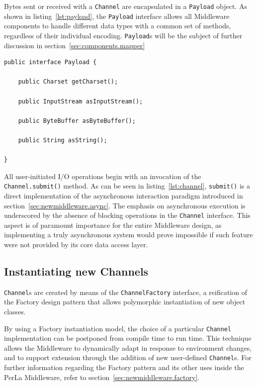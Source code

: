 Bytes sent or received with a \texttt{Channel} are encapsulated in a
\texttt{Payload} object. As shown in listing~\ref{lst:payload}, the
\texttt{Payload} interface allows all Middleware components to handle different
data types with a common set of methods, regardless of their individual
encoding.  \texttt{Payload}s will be the subject of further discussion in
section~\ref{sec:components.mapper}

\lstset{language=Java}
\begin{lstlisting}[float,caption=The Payload interface,label={lst:payload}]
public interface Payload {

	public Charset getCharset();

	public InputStream asInputStream();

	public ByteBuffer asByteBuffer();

	public String asString();

}
\end{lstlisting}

All user-initiated I/O operations begin with an invocation of the
\texttt{Channel.submit()} method. As can be seen in listing~\ref{lst:channel},
\texttt{submit()} is a direct implementation of the asynchronous interaction
paradigm introduced in section~\ref{sec:newmiddleware.async}. The emphasis on
asynchronous execution is underscored by the absence of blocking operations in
the \texttt{Channel} interface. This aspect is of paramount importance for the
entire Middleware design, as implementing a truly asynchronous system would
prove impossible if such feature were not provided by its core data access
layer.


\subsection{Instantiating new Channels}

\texttt{Channel}s are created by means of the \texttt{ChannelFactory}
interface, a reification of the Factory design pattern that allows polymorphic
instantiation of new object classes.

By using a Factory instantiation model, the choice of a particular
\texttt{Channel} implementation can be postponed from compile time to run time.
This technique allows the Middleware to dynamically adapt in response to
environment changes, and to support extension through the addition of new
user-defined \texttt{Channel}s. For further information regarding the Factory
pattern and its other uses inside the PerLa Middleware, refer to
section~\ref{sec:newmiddleware.factory}.

